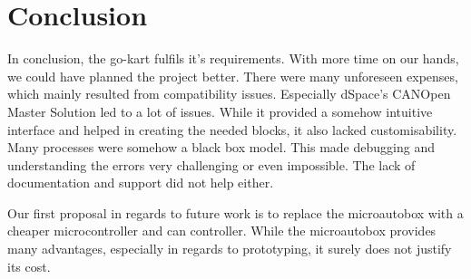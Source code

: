 
\chapter{Conclusion}
\label{chp:Conclusion}


In conclusion, the go-kart fulfils it's requirements. 
With more time on our hands, we could have planned the project better. There were many unforeseen expenses, which mainly resulted from compatibility issues. 
Especially dSpace's CANOpen Master Solution led to a lot of issues. While it provided a somehow intuitive interface and helped in creating the needed blocks, it also lacked customisability. Many processes were somehow a black box model. This made debugging and understanding the errors very challenging or even impossible. The lack of documentation and support did not help either. 

Our first proposal in regards to future work is to replace the microautobox with a cheaper microcontroller and can controller. While the microautobox provides many advantages, especially in regards to prototyping, it surely does not justify its cost.
